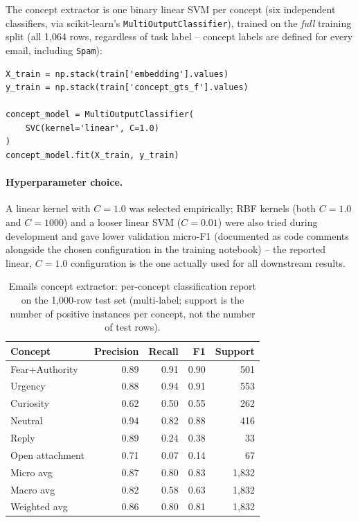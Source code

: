 \documentclass[11pt]{article}
\newcommand{\code}[1]{\texttt{#1}}
\begin{document}
The concept extractor is one binary linear SVM per concept (six
independent classifiers, via scikit-learn's \code{MultiOutputClassifier}),
trained on the \emph{full} training split (all 1{,}064 rows, regardless of
task label -- concept labels are defined for every email, including
\code{Spam}):

\begin{lstlisting}
X_train = np.stack(train['embedding'].values)
y_train = np.stack(train['concept_gts_f'].values)

concept_model = MultiOutputClassifier(
    SVC(kernel='linear', C=1.0)
)
concept_model.fit(X_train, y_train)
\end{lstlisting}

\paragraph{Hyperparameter choice.} A linear kernel with $C=1.0$ was
selected empirically; RBF kernels (both $C=1.0$ and $C=1000$) and a looser
linear SVM ($C=0.01$) were also tried during development and gave lower
validation micro-F1 (documented as code comments alongside the chosen
configuration in the training notebook) -- the reported linear, $C=1.0$
configuration is the one actually used for all downstream results.

\begin{table}[h]
\centering
\begin{tabular}{lrrrr}
\toprule
Concept & Precision & Recall & F1 & Support \\
\midrule
Fear+Authority   & 0.89 & 0.91 & 0.90 & 501 \\
Urgency          & 0.88 & 0.94 & 0.91 & 553 \\
Curiosity        & 0.62 & 0.50 & 0.55 & 262 \\
Neutral          & 0.94 & 0.82 & 0.88 & 416 \\
Reply            & 0.89 & 0.24 & 0.38 & 33 \\
Open attachment  & 0.71 & 0.07 & 0.14 & 67 \\
\midrule
Micro avg    & 0.87 & 0.80 & 0.83 & 1{,}832 \\
Macro avg    & 0.82 & 0.58 & 0.63 & 1{,}832 \\
Weighted avg & 0.86 & 0.80 & 0.81 & 1{,}832 \\
\bottomrule
\end{tabular}
\caption{Emails concept extractor: per-concept classification report on the
1{,}000-row test set (multi-label; support is the number of positive
instances per concept, not the number of test rows).}
\end{table}
\end{document}
